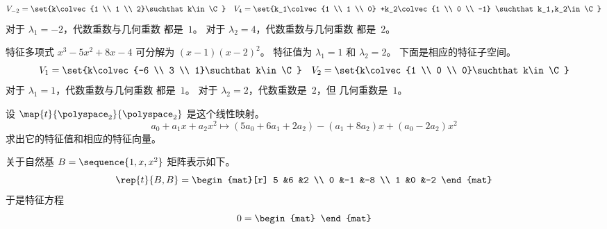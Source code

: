 \begin{exercises}
\begin{answer}
\begin{exparts}
\begin{equation*}
            V_{-2}=\set{k\colvec{1 \\ 1 \\ 2}\suchthat k\in\C}
            \quad
            V_4=\set{k_1\colvec{1 \\ 1 \\ 0}
                      +k_2\colvec{1 \\ 0 \\ -1} \suchthat k_1,k_2\in\C}
          \end{equation*}
          对于 $\lambda_1=-2$，代数重数与几何重数
          都是~$1$。 
          对于 $\lambda_2=4$，代数重数与几何重数
          都是~$2$。
       \item 特征多项式 $x^3 - 5x^2 + 8x - 4$ 可分解为
          $(x-1)(x-2)^2$。
          特征值为 $\lambda_1=1$ 和 $\lambda_2=2$。
          下面是相应的特征子空间。
          \begin{equation*}
            V_1=\set{k\colvec{-6 \\ 3 \\ 1}\suchthat k\in \C}
            \quad
            V_2=\set{k\colvec{1 \\ 0 \\ 0}\suchthat k\in\C}
          \end{equation*}
          对于 $\lambda_1=1$，代数重数与几何重数
          都是~$1$。
          对于 $\lambda_2=2$，代数重数是~$2$，但
          几何重数是~$1$。
      \end{exparts}
    \end{answer}
   \recommended \item
     设 \( \map{t}{\polyspace_2}{\polyspace_2} \) 是这个线性映射。
     \begin{equation*}
      a_0+a_1x+a_2x^2\mapsto
      (5a_0+6a_1+2a_2)-(a_1+8a_2)x+(a_0-2a_2)x^2
     \end{equation*}
    求出它的特征值和相应的特征向量。
    \begin{answer}
      关于自然基 $B=\sequence{1,x,x^2}$ 
      矩阵表示如下。
      \begin{equation*}
        \rep{t}{B,B}
        =
        \begin{mat}[r]
          5  &6  &2  \\
          0  &-1 &-8 \\
          1  &0  &-2 
        \end{mat}
      \end{equation*}
      于是特征方程
      \begin{equation*}
        0
        =
        \begin{mat}

\end{mat}
\end{equation*}
\end{answer}
\end{exercises}

